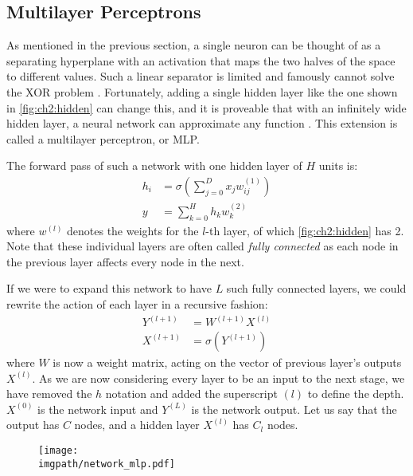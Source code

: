 \subsection{Multilayer Perceptrons}
As mentioned in the previous section, a single neuron can be thought of as a
separating hyperplane with an activation that maps the two halves of the space
to different values. Such a linear separator is limited and famously cannot
solve the XOR problem \cite{minsky_perceptrons:_1988}. Fortunately, adding a
single hidden layer like the one shown in \autoref{fig:ch2:hidden} can change
this, and it is proveable that with an infinitely wide hidden layer, a neural
network can approximate any function \cite{hornik_multilayer_1989,
cybenko_approximation_1989}. This extension is called a multilayer perceptron,
or MLP. 

The forward pass of such a network with one hidden layer of $H$ units is:
%
\begin{align}
  h_i & =  \sigma\left(\sum_{j=0}^{D} x_j w_{ij}^{(1)}\right) \\
  y & =  \sum_{k=0}^{H} h_k w^{(2)}_{k}
\end{align}
%
where $w^{(l)}$ denotes the weights for the $l$-th layer, of which
\autoref{fig:ch2:hidden} has 2. Note that these individual layers are often
called \emph{fully connected} as each node in the previous layer affects every
node in the next.

If we were to expand this network to have $L$ such fully connected layers, we
could rewrite the action of each layer in a recursive fashion:
%
\begin{align}
  Y^{(l+1)} &= W^{(l+1)}X^{(l)}  \label{eq:ch2:fc1}\\
  X^{(l+1)} &= \sigma\left(Y^{(l+1)}\right) \label{eq:ch2:fc2} 
\end{align}
where $W$ is now a weight matrix, acting on the vector of previous layer's
outputs $X^{(l)}$. As we are now considering every layer to be an input to the next
stage, we have removed the $h$ notation and added the superscript $(l)$ to
define the depth. $X^{(0)}$ is the network input and $Y^{(L)}$ is the network
output. Let us say that the output has $C$ nodes, and a hidden layer $X^{(l)}$
has $C_l$ nodes.

\begin{figure}[t]
  \centering
  \texttt{[image: \\imgpath/network\_mlp.pdf]}
  \label{fig:ch2:hidden}
\end{figure}

